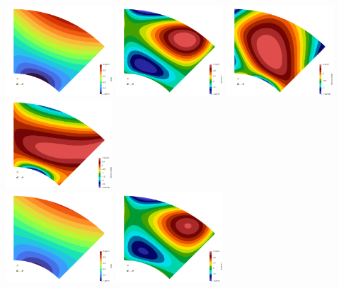\newpage
\begin{center}
\includegraphics[width=4cm]{images/mappings/biquadratic3/elt4/jcob.0000.png}
\includegraphics[width=4cm]{images/mappings/biquadratic3/elt4/f.0000.png}
\includegraphics[width=4cm]{images/mappings/biquadratic3/elt4/dfdx.0000.png}
\includegraphics[width=4cm]{images/mappings/biquadratic3/elt4/dfdy.0000.png}\\
\includegraphics[width=4cm]{images/mappings/biquadratic3/elt4/jcob.0001.png}
\includegraphics[width=4cm]{images/mappings/biquadratic3/elt4/f.0001.png}

\end{center}
